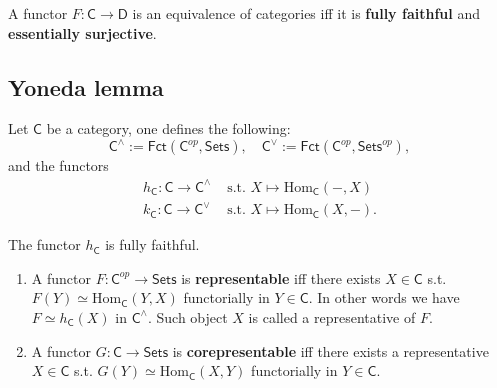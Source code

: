 \begin{prop}
	A functor $F: \mathsf{C} \to \mathsf{D}$ is an equivalence of categories iff it is \textbf{fully faithful} and \textbf{essentially surjective}.
\end{prop} 

\subsection{Yoneda lemma}

\begin{defn}[]
	Let $\mathsf{C}$ be a category, one defines the following:
	\begin{equation}
	\mathsf{C}^\wedge := \mathsf{Fct}\left(\mathsf{C}^{op}, \mathsf{Sets} \right), \quad \mathsf{C}^\vee := \mathsf{Fct}\left(\mathsf{C}^{op}, \mathsf{Sets}^{op} \right)
	,\end{equation} 
	and the functors
	\begin{align}
		h_\mathsf{C}: \mathsf{C} \to \mathsf{C}^\wedge &\text{ s.t. }
		X \mapsto \mathrm{Hom}_{\mathsf{\mathsf{C}}} \left( -, X \right)\\
		k_\mathsf{C}: \mathsf{C} \to \mathsf{C}^\vee &\text{ s.t. }
		X \mapsto \mathrm{Hom}_{\mathsf{\mathsf{C}}} \left( X, - \right)
	.\end{align}
\end{defn}

\begin{lem}[Yoneda]
	The functor $h_\mathsf{C}$ is fully faithful.
\end{lem} 

\begin{defn}\leavevmode\vspace{-\baselineskip}
	\begin{enumerate}
		\item A functor $F: \mathsf{C}^{op} \to \mathsf{Sets}$ is \textbf{representable} iff there exists $X \in \mathsf{C}$ s.t. $F(Y) \simeq \mathrm{Hom}_{\mathsf{C}} \left( Y, X \right)$ functorially in $Y \in \mathsf{C}$.
			In other words we have $F \simeq h_\mathsf{C}(X)$ in $\mathsf{C}^{\wedge}$. 
			Such object $X$ is called a representative of $F$.
		\item A functor $G: \mathsf{C} \to \mathsf{Sets}$ is \textbf{corepresentable} iff there exists a representative $X \in \mathsf{C}$ s.t. $G(Y) \simeq \mathrm{Hom}_{\mathsf{C}} \left( X, Y \right)$ functorially in $Y \in \mathsf{C}$.
	\end{enumerate} 
\end{defn}

